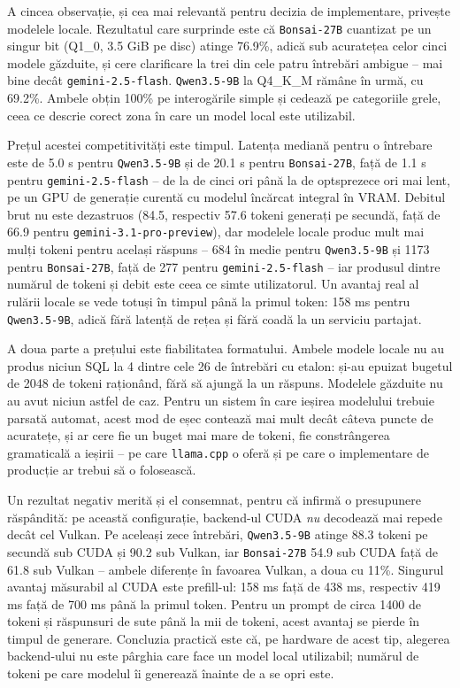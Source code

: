 \documentclass[12pt, a4paper]{report}
\newcommand{\code}[1]{\texttt{#1}}
\begin{document}
A cincea observație, și cea mai relevantă pentru decizia de implementare,
privește modelele locale. Rezultatul care surprinde este că
\code{Bonsai-27B} cuantizat pe un singur bit (Q1\_0, 3.5 GiB pe disc) atinge
76.9\%, adică sub acuratețea celor cinci modele găzduite, și
cere clarificare la trei din cele patru întrebări ambigue -- mai bine decât
\code{gemini-2.5-flash}. \code{Qwen3.5-9B} la Q4\_K\_M rămâne în urmă, cu
69.2\%. Ambele obțin 100\% pe interogările simple și cedează pe categoriile
grele, ceea ce descrie corect zona în care un model local este utilizabil.

Prețul acestei competitivități este timpul. Latența mediană pentru o întrebare
este de 5.0 s pentru \code{Qwen3.5-9B} și de 20.1 s pentru \code{Bonsai-27B},
față de 1.1 s pentru \code{gemini-2.5-flash} -- de la de cinci ori până la de
optsprezece ori mai lent, pe un GPU de generație curentă cu modelul încărcat
integral în VRAM. Debitul brut nu este dezastruos (84.5, respectiv 57.6 tokeni
generați pe secundă, față de 66.9 pentru \code{gemini-3.1-pro-preview}), dar
modelele locale produc mult mai mulți tokeni pentru același răspuns -- 684 în
medie pentru \code{Qwen3.5-9B} și 1173 pentru \code{Bonsai-27B}, față de 277
pentru \code{gemini-2.5-flash} -- iar produsul dintre numărul de tokeni și
debit este ceea ce simte utilizatorul. Un
avantaj real al rulării locale se vede totuși în timpul până la primul token:
158 ms pentru \code{Qwen3.5-9B}, adică fără latență de rețea și fără coadă la
un serviciu partajat.

A doua parte a prețului este fiabilitatea formatului. Ambele modele locale nu au
produs niciun SQL la 4 dintre cele 26 de întrebări cu etalon: și-au epuizat
bugetul de 2048 de tokeni raționând, fără să ajungă la un răspuns. Modelele
găzduite nu au avut niciun astfel de caz. Pentru un sistem în care ieșirea
modelului trebuie parsată automat, acest mod de eșec contează mai mult decât
câteva puncte de acuratețe, și ar cere fie un buget mai mare de tokeni, fie
constrângerea gramaticală a ieșirii -- pe care \code{llama.cpp} o oferă și pe
care o implementare de producție ar trebui să o folosească.

Un rezultat negativ merită și el consemnat, pentru că infirmă o presupunere
răspândită: pe această configurație, backend-ul CUDA \emph{nu} decodează mai
repede decât cel Vulkan. Pe aceleași zece întrebări, \code{Qwen3.5-9B} atinge
88.3 tokeni pe secundă sub CUDA și 90.2 sub Vulkan, iar \code{Bonsai-27B} 54.9
sub CUDA față de 61.8 sub Vulkan -- ambele diferențe în favoarea Vulkan, a doua
cu 11\%. Singurul avantaj măsurabil al CUDA este prefill-ul: 158 ms față de
438 ms, respectiv 419 ms față de 700 ms până la primul token. Pentru un prompt
de circa 1400 de tokeni și răspunsuri de sute până la mii de tokeni, acest
avantaj se pierde în timpul de generare. Concluzia practică este că, pe hardware
de acest tip, alegerea backend-ului nu este pârghia care face un model local
utilizabil; numărul de tokeni pe care modelul îi generează înainte de a se opri
este.
\end{document}

